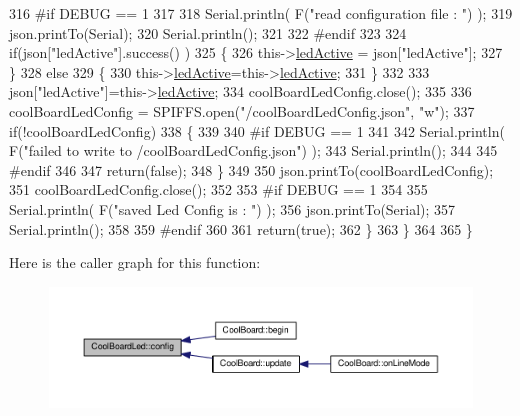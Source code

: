 \begin{DoxyCode}
316 \textcolor{preprocessor}{        #if DEBUG == 1}
317     
318             Serial.println( F(\textcolor{stringliteral}{"read configuration file : "}) );
319             json.printTo(Serial);
320             Serial.println();
321         
322 \textcolor{preprocessor}{        #endif}
323   
324             \textcolor{keywordflow}{if}(json[\textcolor{stringliteral}{"ledActive"}].success() )
325             \{
326                 this->\hyperlink{classCoolBoardLed_a5f17c135516fcf4b44ea8a096ba0177a}{ledActive} = json[\textcolor{stringliteral}{"ledActive"}]; 
327             \}
328             \textcolor{keywordflow}{else}
329             \{
330                 this->\hyperlink{classCoolBoardLed_a5f17c135516fcf4b44ea8a096ba0177a}{ledActive}=this->\hyperlink{classCoolBoardLed_a5f17c135516fcf4b44ea8a096ba0177a}{ledActive};          
331             \}
332             
333             json[\textcolor{stringliteral}{"ledActive"}]=this->\hyperlink{classCoolBoardLed_a5f17c135516fcf4b44ea8a096ba0177a}{ledActive};
334             coolBoardLedConfig.close();
335             
336             coolBoardLedConfig = SPIFFS.open(\textcolor{stringliteral}{"/coolBoardLedConfig.json"}, \textcolor{stringliteral}{"w"});
337             \textcolor{keywordflow}{if}(!coolBoardLedConfig)
338             \{
339             
340 \textcolor{preprocessor}{            #if DEBUG == 1 }
341 
342                 Serial.println( F(\textcolor{stringliteral}{"failed to write to /coolBoardLedConfig.json"}) );
343                 Serial.println();
344 
345 \textcolor{preprocessor}{            #endif}
346 
347                 \textcolor{keywordflow}{return}(\textcolor{keyword}{false});          
348             \}
349 
350             json.printTo(coolBoardLedConfig);
351             coolBoardLedConfig.close();
352 
353 \textcolor{preprocessor}{        #if DEBUG == 1}
354     
355             Serial.println( F(\textcolor{stringliteral}{"saved Led Config is : "}) );
356             json.printTo(Serial);
357             Serial.println();
358 
359 \textcolor{preprocessor}{        #endif}
360 
361             \textcolor{keywordflow}{return}(\textcolor{keyword}{true}); 
362         \}
363     \}   
364 
365 \}               
\end{DoxyCode}
Here is the caller graph for this function\+:
\nopagebreak
\begin{figure}[H]
\begin{center}
\leavevmode
\includegraphics[width=350pt]{classCoolBoardLed_a1b60e5e30bea96c49ed62ed1bf1ffc8b_icgraph}
\end{center}
\end{figure}
\mbox{\label{classCoolBoardLed_a69f323359e0c9f797422f2152b5d41ef}} 

